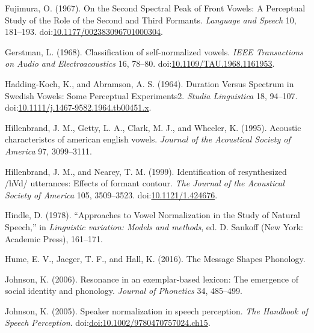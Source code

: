 \documentclass[utf8]{frontiersSCNS}
\newlength{\cslhangindent}
\newlength{\cslentryspacingunit} %
\newenvironment{CSLReferences}[2] %
 {%
  \setlength{\parindent}{0pt}
  \ifodd #1
  \let\oldpar\par
  \def\par{\hangindent=\cslhangindent\oldpar}
  \fi
  \setlength{\parskip}{#2\cslentryspacingunit}
 }%
 {}
\begin{document}
\begin{CSLReferences}{1}{0}
\leavevmode{}%
Fujimura, O. (1967). On the {Second Spectral Peak} of {Front Vowels}: A {Perceptual Study} of the {Role} of the {Second} and {Third Formants}. \emph{Language and Speech} 10, 181--193. doi:\href{https://doi.org/10.1177/002383096701000304}{10.1177/002383096701000304}.

\leavevmode{}%
Gerstman, L. (1968). Classification of self-normalized vowels. \emph{IEEE Transactions on Audio and Electroacoustics} 16, 78--80. doi:\href{https://doi.org/10.1109/TAU.1968.1161953}{10.1109/TAU.1968.1161953}.

\leavevmode{}%
Hadding-Koch, K., and Abramson, A. S. (1964). Duration {Versus Spectrum} in {Swedish Vowels}: {Some Perceptual Experiments2}. \emph{Studia Linguistica} 18, 94--107. doi:\href{https://doi.org/10.1111/j.1467-9582.1964.tb00451.x}{10.1111/j.1467-9582.1964.tb00451.x}.

\leavevmode{}%
Hillenbrand, J. M., Getty, L. A., Clark, M. J., and Wheeler, K. (1995). Acoustic characteristcs of american english vowels. \emph{Journal of the Acoustical Society of America} 97, 3099--3111.

\leavevmode{}%
Hillenbrand, J. M., and Nearey, T. M. (1999). Identification of resynthesized /{hVd}/ utterances: {Effects} of formant contour. \emph{The Journal of the Acoustical Society of America} 105, 3509--3523. doi:\href{https://doi.org/10.1121/1.424676}{10.1121/1.424676}.

\leavevmode{}%
Hindle, D. (1978). {``Approaches to {Vowel Normalization} in the {Study} of {Natural Speech},''} in \emph{Linguistic variation: Models and methods}, ed. D. Sankoff ({New York}: {Academic Press}), 161--171.

\leavevmode{}%
Hume, E. V., Jaeger, T. F., and Hall, K. (2016). The {Message Shapes Phonology}.

\leavevmode{}%
Johnson, K. (2006). Resonance in an exemplar-based lexicon: {The} emergence of social identity and phonology. \emph{Journal of Phonetics} 34, 485--499.

\leavevmode{}%
Johnson, K. (2005). Speaker normalization in speech perception. \emph{The Handbook of Speech Perception}. doi:\href{https://doi.org/doi:10.1002/9780470757024.ch15}{doi:10.1002/9780470757024.ch15}.


\end{CSLReferences}
\end{document}
